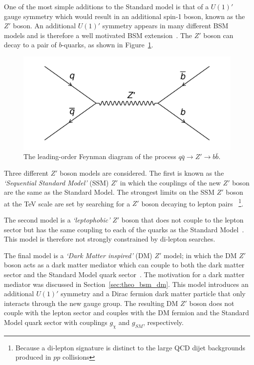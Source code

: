 One of the most simple additions to the Standard model is that of a $U(1)'$ gauge symmetry
which would result in an additional spin-1 boson, known as the $Z'$ boson.
An additional $U(1)'$ symmetry appears in many different BSM models and is therefore a well motivated BSM extension~\cite{theo-bsm_zprime}.
The $Z'$ boson can decay to a pair of $b$-quarks, as shown in Figure~\ref{fig:theo-bsm_zprime}.

\begin{figure}[!hbt]
  \begin{center}
    \includegraphics[width=0.7\linewidth, angle=0]{figs/Theory/bsm_zprime.png}
  \end{center}
  \caption{The leading-order Feynman diagram of the process $q\bar{q} \to Z' \to b\bar{b}$.}
  \label{fig:theo-bsm_zprime}
\end{figure}

Three different $Z'$ boson models are considered.
The first is known as the \textit{`Sequential Standard Model'} (SSM) $Z'$ in which the couplings
of the new $Z'$ boson are the same as the Standard Model.
The strongest limits on the SSM $Z'$ boson at the TeV scale are set by searching for a $Z'$ boson decaying
to lepton pairs~\cite{theo-bsm_dilep} \footnote{Because a di-lepton signature is distinct to the large QCD dijet backgrounds produced in $pp$ collisions}.

The second model is a \textit{`leptophobic'} $Z'$ boson that does not couple to the lepton sector
but has the same coupling to each of the quarks as the Standard Model~\cite{theo-bsm_zprime_leptophobic}.
This model is therefore not strongly constrained by di-lepton searches.

The final model is a \textit{`Dark Matter inspired'} (DM) $Z'$ model;
in which the DM $Z'$ boson acts as a dark matter mediator which can couple to both the dark matter sector and the Standard Model quark sector~\cite{theo_bsm-zprime_dm}.
The motivation for a dark matter mediator was discussed in Section~\ref{sec:theo_bsm_dm}.
This model introduces an additional $U(1)'$ symmetry and a Dirac fermion dark matter particle that only interacts through the new gauge group.
The resulting DM $Z'$ boson does not couple with the lepton sector
and couples with the DM fermion and the Standard Model quark sector with couplings $g_\chi$\hspace{0.1mm} and $g_{SM}$\hspace{0.1mm}, respectively.

